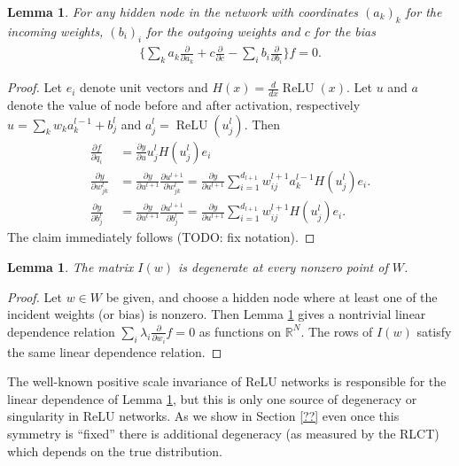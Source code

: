 \documentclass{article} %
\newtheorem{lemma}[theorem]{Lemma}
\begin{document}
\begin{lemma}\label{lemma:reln} For any hidden node in the network with coordinates $(a_k)_k$ for the incoming weights, $(b_i)_i$ for the outgoing weights and $c$ for the bias
\begin{align*}
\Big\{ \sum_k a_{k}\frac{\partial}{\partial a_k} + c \frac{\partial}{\partial c}-\sum_{i} b_i\frac{\partial}{\partial b_i} \Big\} f = 0.
\end{align*}
\end{lemma}
\begin{proof}
Let $e_i$ denote unit vectors and $H(x)=\frac{d}{dx}\operatorname{ReLU}(x)$. Let $u$ and $a$ denote the value of node before and after activation, respectively $u =\sum_k w_k a_{k}^{l-1}+b_{j}^{l}$ and $a_{j}^{l} =\operatorname{ReLU}(u_{j}^{l})$. Then
\begin{align*}
\frac{\partial f}{\partial q_i}&=\frac{\partial y}{\partial u}u_{j}^{l}H(u_{j}^{l})e_{i}\\
\frac{\partial y}{\partial w_{jk}^{l}}&=\frac{\partial y}{\partial u^{l+1}}\frac{\partial u^{l+1}}{\partial w_{jk}^{l}}=\frac{\partial y}{\partial u^{l+1}}\sum_{i=1}^{d_{l+1}}w_{ij}^{l+1}a_{k}^{l-1}H(u_{j}^{l})e_{i}.\\
\frac{\partial y}{\partial b_{j}^{l}}&=\frac{\partial y}{\partial u^{l+1}}\frac{\partial u^{l+1}}{\partial b_{j}^{l}}=\frac{\partial y}{\partial u^{l+1}}\sum_{i=1}^{d_{l+1}}w_{ij}^{l+1}H(u_{j}^{l})e_{i}.
\end{align*}
The claim immediately follows (TODO: fix notation).
\end{proof}

\begin{lemma} The matrix $I(w)$ is degenerate at every nonzero point of $W$.
\end{lemma}
\begin{proof}
Let $w \in W$ be given, and choose a hidden node where at least one of the incident weights (or bias) is nonzero. Then Lemma \ref{lemma:reln} gives a nontrivial linear dependence relation $\sum_i \lambda_i \frac{\partial}{\partial w_i} f = 0$ as functions on $\mathbb{R}^N$. The rows of $I(w)$ satisfy the same linear dependence relation.
\end{proof}

The well-known positive scale invariance of ReLU networks is responsible for the linear dependence of Lemma \ref{lemma:reln}, but this is only one source of degeneracy or singularity in ReLU networks. As we show in Section \ref{??} even once this symmetry is ``fixed'' there is additional degeneracy (as measured by the RLCT) which depends on the true distribution.
\end{document}
